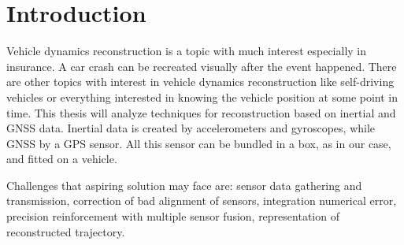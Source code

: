 \chapter{Introduction}
\label{chap:intro}

Vehicle dynamics reconstruction is a topic with much interest especially in insurance. A car crash can be recreated visually after the event happened. There are other topics with interest in vehicle dynamics reconstruction like self-driving vehicles or everything interested in knowing the vehicle position at some point in time.
This thesis will analyze techniques for reconstruction based on inertial and GNSS data.
Inertial data is created by accelerometers and gyroscopes, while GNSS by a GPS sensor.
All this sensor can be bundled in a box, as in our case, and fitted on a vehicle.


Challenges that aspiring solution may face are: sensor data gathering and transmission, correction of bad alignment of sensors, integration numerical error, precision reinforcement with multiple sensor fusion, representation of reconstructed trajectory.

